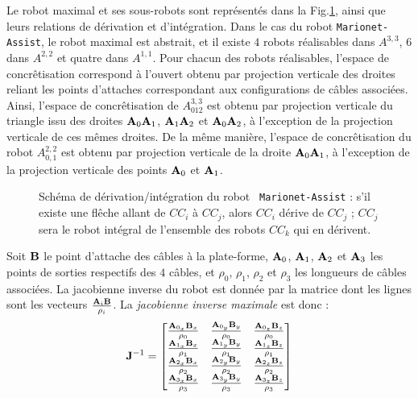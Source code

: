 Le robot maximal et ses sous-robots sont repr\'esent\'es dans la 
Fig.\ref{chap01:fig1}, ainsi que leurs relations de d\'erivation et 
d'int\'egration. Dans le cas du robot {\tt Marionet-Assist}, le robot maximal 
est abstrait, et il existe $4$ robots r\'ealisables dans $A^{3,3}$, $6$ dans 
$A^{2,2}$ et quatre dans $A^{1,1}$. Pour chacun des robots r\'ealisables, 
l'espace de concr\^etisation correspond \`a l'ouvert obtenu par projection 
verticale des droites reliant les points d'attaches correspondant aux 
configurations de c\^ables associ\'ees. Ainsi, l'espace de concr\^etisation de 
$A^{3,3}_{012}$ est obtenu par projection verticale du triangle issu des 
droites ${\bf A}_0{\bf A}_1$, ${\bf A}_1{\bf A}_2$ et ${\bf A}_0{\bf A}_2$, \`a 
l'exception de la projection verticale de ces m\^emes droites. De la m\^eme 
mani\`ere, l'espace de concr\^etisation du robot $A^{2,2}_{0,1}$ est obtenu par 
projection verticale de la droite ${\bf A}_0{\bf A}_1$, \`a l'exception de la 
projection verticale des points ${\bf A}_0$ et ${\bf A}_1$.

\begin{figure}[htp]
  \centering
    \def\svgwidth{.65\linewidth}
  
    \caption{\footnotesize{Schéma de d\'erivation/int\'egration du robot {\tt 
Marionet-Assist} : s'il existe une fl\^eche allant de $CC_i$ \`a $CC_j$, 
alors $CC_i$ d\'erive de $CC_j$ ; $CC_j$ sera le robot int\'egral de l'ensemble 
des robots $CC_k$ qui en d\'erivent.}}
\label{chap01:fig1}
\end{figure}

Soit ${\bf B}$ le point d'attache des c\^ables \`a la plate-forme, ${\bf 
A}_0$, ${\bf A}_1$, ${\bf A}_2$ et ${\bf A}_3$ les points de sorties 
respectifs des $4$ c\^ables, et $\rho_0$, $\rho_1$, $\rho_2$ et $\rho_3$ les 
longueurs de c\^ables associ\'ees. La jacobienne inverse du robot est donn\'ee 
par la matrice dont les lignes sont les vecteurs $\frac {{\bf A}_i{\bf 
B}}{\rho_i}$. La {\it jacobienne inverse maximale} est donc :
\begin{equation}
{\bf J}^{-1} = 
\begin{bmatrix}
\frac {{\bf A}_{0_x}{\bf B}_x} {\rho_0} & \frac {{\bf A}_{0_y}{\bf B}_y} 
{\rho_0} & \frac {{\bf A}_{0_z}{\bf B}_z} {\rho_0} \\
\frac {{\bf A}_{1_x}{\bf B}_x} {\rho_1} & \frac {{\bf A}_{1_y}{\bf B}_y} 
{\rho_1} & \frac {{\bf A}_{1_z}{\bf B}_z} {\rho_1} \\
\frac {{\bf A}_{2_x}{\bf B}_x} {\rho_2} & \frac {{\bf A}_{2_y}{\bf B}_y} 
{\rho_2} & \frac {{\bf A}_{2_z}{\bf B}_z} {\rho_2} \\
\frac {{\bf A}_{3_x}{\bf B}_x} {\rho_3} & \frac {{\bf A}_{3_y}{\bf B}_y} 
{\rho_3} & \frac {{\bf A}_{3_z}{\bf B}_z} {\rho_3} \\
\end{bmatrix}
\label{chap01:eq01}
\end{equation}

